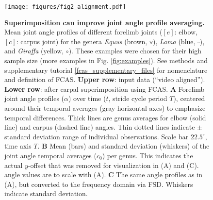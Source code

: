 \begin{figure}[p]%
\centering
\texttt{[image: figures/fig2\_alignment.pdf]}
\caption{\textbf{Superimposition can improve joint angle profile averaging.}
Mean joint angle profiles of different forelimb joints ($[e]$: elbow, $[c]$: carpus joint) for the genera \textit{Equus} (brown, $\triangledown$), \textit{Lama} (blue, $\square$), and \textit{Giraffa} (yellow, $\circ$). These examples were chosen for their high sample size (more examples in Fig. \ref*{fig:examples}). See methods and supplementary tutorial \ref{fcas_supplementary_files} for nomenclature and definition of FCAS.
\textbf{Upper row}: input data (``video aligned''). \textbf{Lower row}: after carpal superimposition using FCAS.
\textbf{A} Forelimb joint angle profiles ($\alpha$) over time ($t$, stride cycle period $T$), centered around their temporal averages (gray horizontal axes) to emphasize temporal differences. Thick lines are genus averages for elbow (solid line) and carpus (dashed line)  angles. Thin dotted lines indicate $\pm$standard deviation range of individual observations. Scale bar $22.5^{\circ}$, time axis $T$.
\textbf{B} Mean (bars) and standard deviation (whiskers) of the joint angle temporal averages ($c_0$) per genus. This indicates the actual $y$-offset that was removed for visualization in (A) and (C).  angle values are to scale with (A).
\textbf{C} The same  angle profiles as in (A), but converted to the frequency domain via FSD. Whiskers indicate standard deviation. }
\label{fig:superimposition}
\end{figure}


